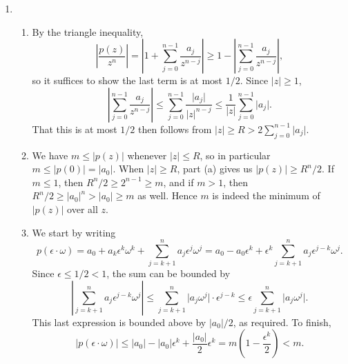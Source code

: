\begin{enumerate}
\begin{enumerate}
\end{enumerate}
\item \begin{enumerate}
\item By the triangle inequality,
\begin{equation*}
\left\lvert\frac{p(z)}{z^n}\right\rvert = \left\lvert 1 + \sum_{j = 0}^{n - 1}\frac{a_j}{z^{n - j}}\right\rvert\geq 1 - \left\lvert\sum_{j = 0}^{n - 1}\frac{a_j}{z^{n - j}}\right\rvert,
\end{equation*}
so it suffices to show the last term is at most $1/2$. Since $\lvert z\rvert\geq 1$,
\begin{equation*}
\left\lvert\sum_{j = 0}^{n - 1}\frac{a_j}{z^{n - j}}\right\rvert\leq\sum_{j = 0}^{n - 1}\frac{\lvert a_j\rvert}{\lvert z\rvert^{n - j}}\leq\frac{1}{\lvert z\rvert}\sum_{j = 0}^{n - 1}\lvert a_j\rvert.
\end{equation*}
That this is at most $1/2$ then follows from $\lvert z\rvert\geq R > 2\sum_{j = 0}^{n - 1}\lvert a_j\rvert$.
\item We have $m\leq\lvert p(z)\rvert$ whenever $\lvert z\rvert\leq R$, so in particular $m\leq\lvert p(0)\rvert = \lvert a_0\rvert$. When $\lvert z\rvert\geq R$, part (a) gives us $\lvert p(z)\rvert\geq R^n/2$. If $m\leq 1$, then $R^n/2\geq 2^{n - 1}\geq m$, and if $m > 1$, then $R^n/2\geq\lvert a_0\rvert^n > \lvert a_0\rvert\geq m$ as well. Hence $m$ is indeed the minimum of $\lvert p(z)\rvert$ over all $z$.
\item We start by writing
\begin{equation*}
p(\epsilon\cdot\omega) = a_0 + a_k\epsilon^k\omega^k + \sum_{j = k + 1}^n a_j\epsilon^j\omega^j = a_0 - a_0\epsilon^k + \epsilon^k\sum_{j = k + 1}^n a_j\epsilon^{j - k}\omega^j.
\end{equation*}
Since $\epsilon\leq 1/2 < 1$, the sum can be bounded by
\begin{equation*}
\left\lvert\sum_{j = k + 1}^n a_j\epsilon^{j - k}\omega^j\right\rvert\leq\sum_{j = k + 1}^n \lvert a_j\omega^j\rvert\cdot\epsilon^{j - k}\leq\epsilon\sum_{j = k + 1}^n\lvert a_j\omega^j\rvert.
\end{equation*}
This last expression is bounded above by $\lvert a_0\rvert/2$, as required. To finish,
\begin{equation*}
\lvert p(\epsilon\cdot\omega)\rvert\leq\lvert a_0\rvert - \lvert a_0\rvert\epsilon^k + \frac{\lvert a_0\rvert}{2}\epsilon^k = m\left(1 - \frac{\epsilon^k}{2}\right) < m.
\end{equation*}
\end{enumerate}

\end{enumerate}
